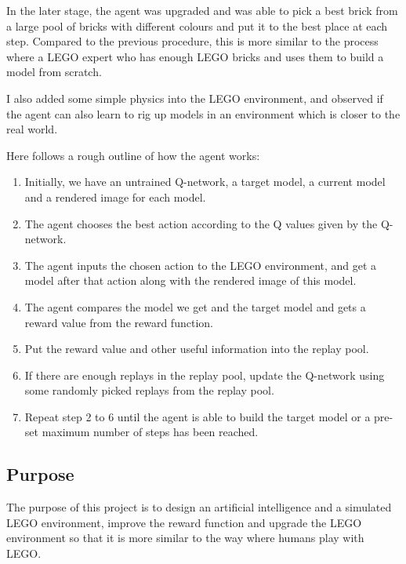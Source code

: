 \documentclass[a4paper]{article}
\begin{document}
            In the later stage, the agent was upgraded and was able to pick
            a best brick from a large pool of bricks with different colours
            and put it to the best place at each step. Compared to the previous
            procedure, this is more similar to the process where a LEGO expert
            who has enough LEGO bricks and uses them to build a model from
            scratch. 
            
            I also added some simple physics into the LEGO environment, and observed if the agent can also learn to rig up models in an environment which is closer to the real world. 
            
            Here follows a rough outline of how the agent works: 
            
            \begin{enumerate}[leftmargin=1.5cm]
                \item Initially, we have an untrained Q-network, a target
                model, a current model and a rendered image for each model.
                \item The agent chooses the best action according to the Q
                values given by the Q-network.
                \item The agent inputs the chosen action to the LEGO
                environment, and get a model after that action along with
                the rendered image of this model.
                \item The agent compares the model we get and the target
                model and gets a reward value from the reward function.
                \item Put the reward value and other useful information
                into the replay pool.
                \item If there are enough replays in the replay pool, update
                the Q-network using some randomly picked replays from the
                replay pool.
                \item Repeat step 2 to 6 until the agent is able to build the
                target model or a pre-set maximum number of steps has been reached.
            \end{enumerate}
            
        \subsection{Purpose}
            The purpose of this project is to design an artificial intelligence
            and a simulated LEGO environment, improve the reward function and upgrade
            the LEGO environment so that it is more similar to the way where humans
            play with LEGO. 
            
\end{document}
